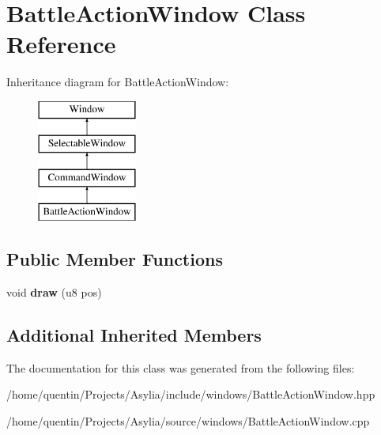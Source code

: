 \hypertarget{classBattleActionWindow}{\section{Battle\-Action\-Window Class Reference}
\label{classBattleActionWindow}
}
Inheritance diagram for Battle\-Action\-Window\-:\begin{figure}[H]
\begin{center}
\leavevmode
\includegraphics[height=4.000000cm]{classBattleActionWindow}
\end{center}
\end{figure}
\subsection*{Public Member Functions}
\begin{DoxyCompactItemize}
\item 
\hypertarget{classBattleActionWindow_a69934cbf60e25e06ae36690c9fd7babd}{void {\bfseries draw} (u8 pos)}\label{classBattleActionWindow_a69934cbf60e25e06ae36690c9fd7babd}

\end{DoxyCompactItemize}
\subsection*{Additional Inherited Members}


The documentation for this class was generated from the following files\-:\begin{DoxyCompactItemize}
\item 
/home/quentin/\-Projects/\-Asylia/include/windows/Battle\-Action\-Window.\-hpp\item 
/home/quentin/\-Projects/\-Asylia/source/windows/Battle\-Action\-Window.\-cpp\end{DoxyCompactItemize}
